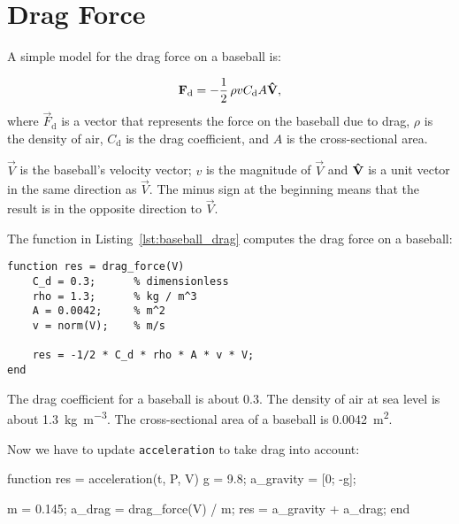 \section{Drag Force}
\label{drag}


A simple model for the drag force on a baseball is:

\begin{equation*}
    \vec{F}_\mathrm{d} = - \frac{1}{2} \, \rho v C_\mathrm{d} A \uvec{V},
\end{equation*}
where $\vec{F}_\mathrm{d}$ is a vector that represents the force on the baseball
due to drag, 
$\rho$ is the density of air, 
$C_\mathrm{d}$ is the drag coefficient, and
$A$ is the cross-sectional area.


$\vec{V}$ is the baseball's velocity vector; $v$ is the magnitude of $\vec{V}$ and $\uvec{V}$ is a unit vector in the same direction as $\vec{V}$.  The minus sign at the beginning means that the result is in the opposite direction to $\vec{V}$.


The function in Listing~\ref{lst:baseball_drag} computes the drag force on a baseball:

\begin{lstlisting}[caption={A function that calculates the drag force on a baseball}, label={lst:baseball_drag}]
 function res = drag_force(V)
    C_d = 0.3;      % dimensionless
    rho = 1.3;      % kg / m^3
    A = 0.0042;     % m^2
    v = norm(V);    % m/s

    res = -1/2 * C_d * rho * A * v * V;
end
\end{lstlisting}
  
The drag coefficient for a baseball is about 0.3.  
The density of air at sea level is about \SI{1.3}{\kilogram\per\meter\cubed}.
The cross-sectional area of a baseball is \SI{0.0042}{\meter\squared}.


Now we have to update \lstinline{acceleration} to take drag into account:

\begin{code}
function res = acceleration(t, P, V)
    g = 9.8;                       %
    a_gravity = [0; -g];

    m = 0.145;                     %
    a_drag = drag_force(V) / m;
    res = a_gravity + a_drag;
end
\end{code}

